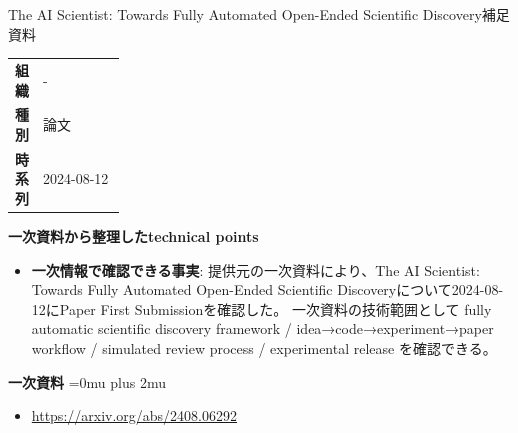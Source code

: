 \begin{technicalnote}{The AI Scientist: Towards Fully Automated Open-Ended Scientific Discovery}{補足資料}
\begingroup
\begin{tabularx}{\linewidth}{@{}>{\bfseries}p{0.22\linewidth}X@{}}
組織 & - \\
種別 & 論文 \\
時系列 & 2024-08-12 \\
\end{tabularx}
\smallskip
{\bfseries 一次資料から整理したtechnical points}
\begin{itemize}[leftmargin=1.5em,itemsep=0.35em]
\item \textbf{一次情報で確認できる事実}: 提供元の一次資料により、The AI Scientist: Towards Fully Automated Open-Ended Scientific Discoveryについて2024-08-12にPaper First Submissionを確認した。 一次資料の技術範囲として fully automatic scientific discovery framework / idea→code→experiment→paper workflow / simulated review process / experimental release を確認できる。
\end{itemize}
\begin{minipage}{\linewidth}
\begin{samepage}
{\bfseries 一次資料}
\begingroup\sloppy
\Urlmuskip=0mu plus 2mu\relax
\begin{itemize}[leftmargin=1.5em,itemsep=0.25em]
\item {\scriptsize\url{https://arxiv.org/abs/2408.06292}}
\end{itemize}
\endgroup
\end{samepage}
\end{minipage}
\endgroup
\end{technicalnote}
\medskip
